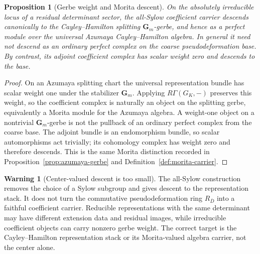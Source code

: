 \documentclass[11pt]{article}
\newtheorem{proposition}[theorem]{Proposition}
\theoremstyle{definition}
\newtheorem{warning}[theorem]{Warning}
\newcommand{\Gm}{\mathbf G_m}
\begin{document}
\begin{proposition}[Gerbe weight and Morita descent]\label{prop:all-sylow-morita}
On the absolutely irreducible locus of a residual determinant sector, the all-Sylow coefficient carrier descends canonically to the Cayley--Hamilton splitting $\Gm$-gerbe, and hence as a perfect module over the universal Azumaya Cayley--Hamilton algebra.  In general it need not descend as an ordinary perfect complex on the coarse pseudodeformation base.  By contrast, its adjoint coefficient complex has scalar weight zero and descends to the base.
\end{proposition}

\begin{proof}
On an Azumaya splitting chart the universal representation bundle has scalar weight one under the stabilizer $\Gm$.  Applying $R\Gamma(G_K,-)$ preserves this weight, so the coefficient complex is naturally an object on the splitting gerbe, equivalently a Morita module for the Azumaya algebra.  A weight-one object on a nontrivial $\Gm$-gerbe is not the pullback of an ordinary perfect complex from the coarse base.  The adjoint bundle is an endomorphism bundle, so scalar automorphisms act trivially; its cohomology complex has weight zero and therefore descends.  This is the same Morita distinction recorded in Proposition~\ref{prop:azumaya-gerbe} and Definition~\ref{def:morita-carrier}.
\end{proof}

\begin{warning}[Center-valued descent is too small]\label{warn:center-sylow-descent}
The all-Sylow construction removes the choice of a Sylow subgroup and gives descent to the representation stack.  It does not turn the commutative pseudodeformation ring $R_{\bar D}$ into a faithful coefficient carrier.  Reducible representations with the same determinant may have different extension data and residual images, while irreducible coefficient objects can carry nonzero gerbe weight.  The correct target is the Cayley--Hamilton representation stack or its Morita-valued algebra carrier, not the center alone.
\end{warning}
\end{document}
